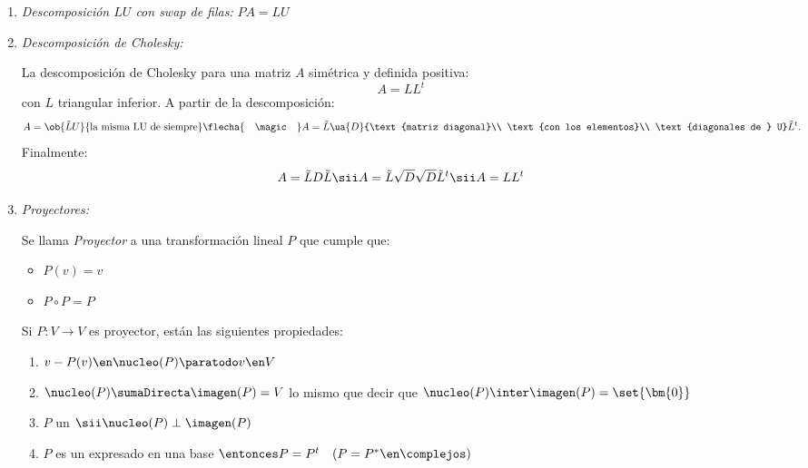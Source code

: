 \begin{enumerate}[label=\tiny\purple{\faIcon{snowman}}]
  \item \textit{Descomposición $LU$ con swap de filas:} \quad $PA = LU$

  \item \hypertarget{teoría-3:cholesky}{\textit{Descomposición de Cholesky:}}

        La descomposición de Cholesky para una matriz $A$ simétrica y definida positiva:
        $$
          A = L L^t
        $$
        con $L$ triangular inferior. A partir de la descomposición:
        $$
          A = \ob{\tilde{L} U}{\text{la misma LU de siempre}}
          \flecha{\quad\magic\quad}
          A = \tilde{L}
          \ua{D}{\text{matriz diagonal}\\ \text{con los elementos}\\ \text{diagonales de } U} \tilde{L}^t
          .
        $$
        Finalmente:
        $$
          A = \tilde{L} D \tilde{L}
          \sii
          A = \tilde{L} \sqrt{D} \sqrt{D} \tilde{L}^t
          \sii
          A = LL^t
        $$

  \item \hypertarget{teoria-3:proyector}{\textit{Proyectores:}}

        Se llama  \textit{Proyector} a una transformación lineal $P$ que cumple que:
        \begin{itemize}
          \item $P(v) = v$
          \item $P \circ P = P$
        \end{itemize}
        Si $P: V \to V$ es proyector, están las siguientes propiedades:
        \begin{enumerate}[label=\poo]
          \item $v - P(v) \en \nucleo(P) \paratodo v \en V$
          \item  $ \nucleo(P) \sumaDirecta \imagen(P) = V$
                lo mismo que decir que
                $\nucleo(P) \inter \imagen(P) = \set{\bm{0}}$
          \item $P$ un \textit{}
                $\sii \nucleo(P) \perp \imagen(P)$
          \item $P$ es un \textit{} expresado en una base \textit{}
                $\entonces P = P^t \quad (P = P^* \en \complejos)$


\end{enumerate}
\end{enumerate}

